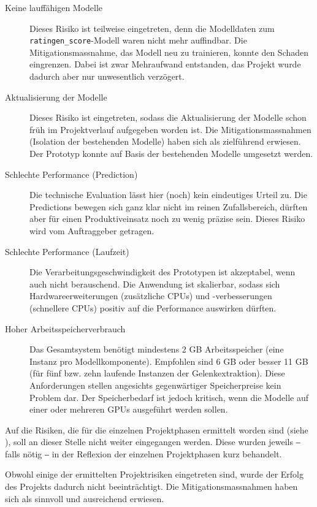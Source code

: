 \begin{description}
    \item[Keine lauffähigen Modelle] Dieses Risiko ist teilweise eingetreten, denn die Modelldaten zum \texttt{ratingen\_score}-Modell waren nicht mehr auffindbar. Die Mitigationsmassnahme, das Modell neu zu trainieren, konnte den Schaden eingrenzen. Dabei ist zwar Mehraufwand entstanden, das Projekt wurde dadurch aber nur unwesentlich verzögert.
    \item[Aktualisierung der Modelle] Dieses Risiko ist eingetreten, sodass die Aktualisierung der Modelle schon früh im Projektverlauf aufgegeben worden ist. Die Mitigationsmassnahmen (Isolation der bestehenden Modelle) haben sich als zielführend erwiesen. Der Prototyp konnte auf Basis der bestehenden Modelle umgesetzt werden.
    \item[Schlechte Performance (Prediction)] Die technische Evaluation lässt hier (noch) kein eindeutiges Urteil zu. Die Predictions bewegen sich ganz klar nicht im reinen Zufallsbereich, dürften aber für einen Produktiveinsatz noch zu wenig präzise sein. Dieses Risiko wird vom Auftraggeber getragen.
    \item[Schlechte Performance (Laufzeit)] Die Verarbeitungsgeschwindigkeit des Prototypen ist akzeptabel, wenn auch nicht berauschend. Die Anwendung ist skalierbar, sodass sich Hardwareerweiterungen (zusätzliche CPUs) und -verbesserungen (schnellere CPUs) positiv auf die Performance auswirken dürften.
    \item[Hoher Arbeitsspeicherverbrauch] Das Gesamtsystem benötigt mindestens 2 GB Arbeitsspeicher (eine Instanz pro Modellkomponente). Empfohlen sind 6 GB oder besser 11 GB (für fünf bzw. zehn laufende Instanzen der Gelenkextraktion). Diese Anforderungen stellen angesichts gegenwärtiger Speicherpreise kein Problem dar. Der Speicherbedarf ist jedoch kritisch, wenn die Modelle auf einer oder mehreren GPUs ausgeführt werden sollen.
\end{description}

Auf die Risiken, die für die einzelnen Projektphasen ermittelt worden sind (siehe ), soll an dieser Stelle nicht weiter eingegangen werden. Diese wurden jeweils ‒ falls nötig ‒ in der Reflexion der einzelnen Projektphasen kurz behandelt.

Obwohl einige der ermittelten Projektrisiken eingetreten sind, wurde der Erfolg des Projekts dadurch nicht beeinträchtigt. Die Mitigationsmassnahmen haben sich als sinnvoll und ausreichend erwiesen.

